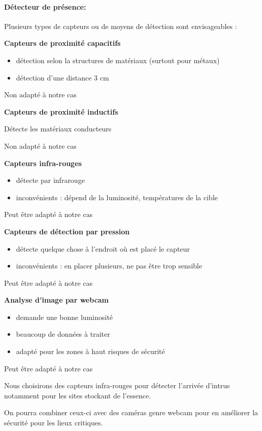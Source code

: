 \documentclass{article}
\begin{document}
\paragraph{Détecteur de présence:}

Plusieurs types de capteurs ou de moyens de détection sont envisageables
:

\textbf{Capteurs de proximité capacitifs}

\begin{itemize}
\item détection selon la structures de matériaux (surtout pour métaux)
\item détection d’une distance 3 cm
\end{itemize}

Non adapté à notre cas

\textbf{Capteurs de proximité inductifs}

Détecte les matériaux conducteurs

Non adapté à notre cas

\textbf{Capteurs infra-rouges}

\begin{itemize}
\item détecte par infrarouge
\item inconvénients : dépend de la luminosité, températures de la cible
\end{itemize}
Peut être adapté à notre cas

\textbf{Capteurs de détection par pression}

\begin{itemize}
\item détecte quelque chose à l’endroit où est placé le capteur
\item inconvénients : en placer plusieurs, ne pas être trop sensible
\end{itemize}
Peut être adapté à notre cas

\textbf{Analyse d’image par webcam}
\begin{itemize}
\item demande une bonne luminosité
\item beaucoup de données à traiter
\item adapté pour les zones à haut risques de sécurité
\end{itemize}
Peut être adapté à notre cas

Nous choisirons des capteurs infra-rouges pour détecter l’arrivée
d’intrus notamment pour les sites stockant de l’essence.

On pourra combiner ceux-ci avec des caméras genre webcam pour en
améliorer la sécurité pour les lieux critiques.
\end{document}
